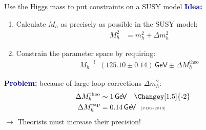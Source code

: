 \documentclass[hyperref={pdfpagelabels=false},ngerman]{beamer}
\newcommand{\eh}[1]{\,\mathsf{#1}}
\newcommand{\MS}{\ensuremath{M_S}}
\newcommand{\mycite}[1]{\ensuremath{\text{\textcolor{darkgray}{\tiny [#1]}}}}
\renewcommand{\emph}[1]{\textbf{\textcolor{darkblue}{#1}}}
\newcommand{\GeV}{\eh{GeV}}
\begin{document}

\begin{frame}{Use the Higgs mass to put constraints on a SUSY model}
  \emph{Idea:}
  \begin{enumerate}
  \item Calculate $M_h$ as precisely as possible in the SUSY model:
  \begin{align*}
    M_h^2 &= m_h^2 + \Delta m_h^2
  \end{align*}
  \item Constrain the parameter space by requiring:
    \begin{align*}
      M_h \overset{!}{=} (125.10 \pm 0.14) \GeV \pm \Delta M_h^{\text{theo}}
    \end{align*}
  \end{enumerate}
  \emph{Problem:} because of large loop corrections $\Delta m_h^2$:
  \begin{align*}
    \Delta M_h^{\text{theo}} &\sim 1\GeV \quad \text{\Changey[1.5]{-2}} \\
    \Delta M_h^{\text{exp}} &= 0.14\GeV \ \ \mycite{PDG-2019}
  \end{align*}
  $\rightarrow$ Theorists must increase their precision!
\end{frame}



\end{document}
